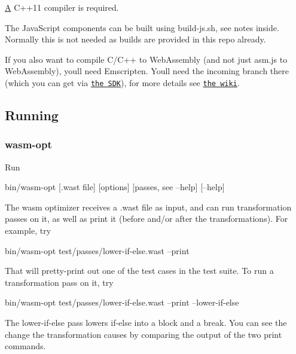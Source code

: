 \begin{DoxyItemize}
\item \mbox{\hyperlink{struct_a}{A}} C++11 compiler is required.
\item The Java\+Script components can be built using {\ttfamily build-\/js.\+sh}, see notes inside. Normally this is not needed as builds are provided in this repo already.
\end{DoxyItemize}

If you also want to compile C/\+C++ to Web\+Assembly (and not just asm.\+js to Web\+Assembly), you\textquotesingle{}ll need Emscripten. You\textquotesingle{}ll need the {\ttfamily incoming} branch there (which you can get via \href{http://kripken.github.io/emscripten-site/docs/getting_started/downloads.html}{\tt the S\+DK}), for more details see \href{https://github.com/kripken/emscripten/wiki/WebAssembly}{\tt the wiki}.

\subsection*{Running}

\subsubsection*{wasm-\/opt}

Run


\begin{DoxyCode}
bin/wasm-opt [.wast file] [options] [passes, see --help] [--help]
\end{DoxyCode}


The wasm optimizer receives a .wast file as input, and can run transformation passes on it, as well as print it (before and/or after the transformations). For example, try


\begin{DoxyCode}
bin/wasm-opt test/passes/lower-if-else.wast --print
\end{DoxyCode}


That will pretty-\/print out one of the test cases in the test suite. To run a transformation pass on it, try


\begin{DoxyCode}
bin/wasm-opt test/passes/lower-if-else.wast --print --lower-if-else
\end{DoxyCode}


The {\ttfamily lower-\/if-\/else} pass lowers if-\/else into a block and a break. You can see the change the transformation causes by comparing the output of the two print commands.

